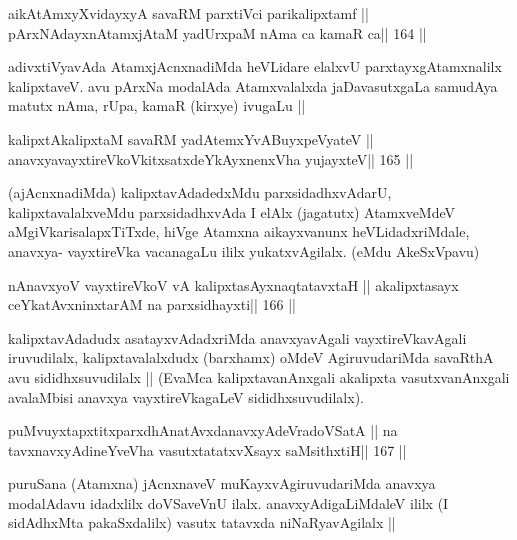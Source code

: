 \begin{shl}
aikAtAmxyXvidayxyA savaRM parxtiVci parikalipxtamf ||
pArxNAdayxnAtamxjAtaM yadUrxpaM nAma ca kamaR ca\hfill || 164 ||
\end{shl}

\begin{artha}
adivxtiVyavAda AtamxjAcnxnadiMda heVLidare elalxvU parxtayxgAtamxnalilx 
kalipxtaveV. avu pArxNa modalAda Atamxvalalxda jaDavasutxgaLa samudAya matutx nAma, rUpa, kamaR (kirxye) ivugaLu ||
\end{artha}

\begin{shl}
kalipxtAkalipxtaM savaRM yadA\s\s temxYvABuyxpeVyateV ||
anavxyavayxtireVkoVkitxsatxdeYkAyxnenxVha yujayxteV\hfill || 165 ||
\end{shl}

\begin{artha}
(ajAcnxnadiMda) kalipxtavAdadedxMdu parxsidadhxvAdarU, 
kalipxtavalalxveMdu parxsidadhxvAda I elAlx (jagatutx) AtamxveMdeV aMgiVkarisalapxTiTxde, hiVge Atamxna aikayxvanunx heVLidadxriMdale, anavxya- vayxtireVka vacanagaLu ililx yukatxvAgilalx. (eMdu AkeSxVpavu)
\end{artha}


\begin{shl}
nAnavxyoV vayxtireVkoV vA kalipxtasAyxnaqtatavxtaH ||
akalipxtasayx ceYkatAvxninxtarAM na parxsidhayxti\hfill || 166 ||
\end{shl}

\begin{artha}
kalipxtavAdadudx asatayxvAdadxriMda anavxyavAgali vayxtireVkavAgali 
iruvudilalx, kalipxtavalalxdudx (barxhamx) oMdeV AgiruvudariMda savaRthA avu sididhxsuvudilalx || (EvaMca kalipxtavanAnxgali akalipxta vasutxvanAnxgali avalaMbisi anavxya vayxtireVkagaLeV sididhxsuvudilalx).
\end{artha}


\begin{shl}
puMvuyxtapxtitxparxdhAnatAvxdanavxyAdeVradoVSatA ||
na tavxnavxyAdineYveVha vasutxtatatxvXsayx saMsithxtiH\hfill || 167 ||
\end{shl}

\begin{artha}
puruSana (Atamxna) jAcnxnaveV muKayxvAgiruvudariMda anavxya modalAdavu 
idadxlilx doVSaveVnU ilalx. anavxyAdigaLiMdaleV ililx (I sidAdhxMta pakaSxdalilx) vasutx tatavxda niNaRyavAgilalx ||
\end{artha}

